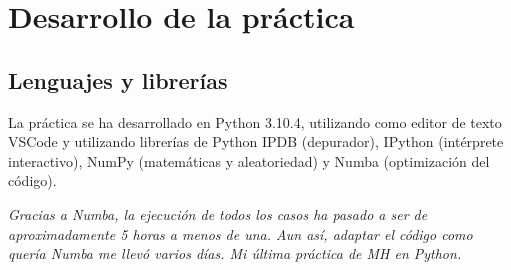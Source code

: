 \documentclass{article}
\begin{document}
    \pagebreak
    \begin{algorithmic}
                            \EndIf
                        \EndFor
                        \EndIf
                    \EndFor
                \EndWhile
                            \EndIf
                        \EndFor
                        \EndIf
                    \EndFor
                \EndWhile
            \EndIf
        \EndFunction
    \end{algorithmic}

    \pagebreak
    \section{Desarrollo de la práctica}

    \subsection{Lenguajes y librerías}
    La práctica se ha desarrollado en Python 3.10.4, utilizando como editor de texto VSCode y
    utilizando librerías de Python IPDB (depurador), IPython (intérprete interactivo),
    NumPy (matemáticas y aleatoriedad) y Numba (optimización del código).

    \emph{Gracias a Numba, la ejecución de todos los casos ha pasado a ser de aproximadamente 5 horas
    a menos de una. Aun así, adaptar el código como quería Numba me llevó varios días. Mi última práctica
    de MH en Python.}
\end{document}
